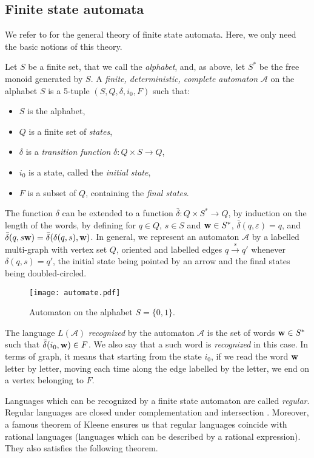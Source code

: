 \documentclass[reqno,12pt]{amsart}
\theoremstyle{definition}
\begin{document}
\subsection{Finite state automata}


We refer to \cite{HOP} for the general theory of finite state automata. Here, we only need the basic notions of this theory.

Let $S$ be a finite set, that we call the \emph{alphabet}, and, as above, let $S^*$ be the free monoid generated by $S$. A \emph{finite, deterministic, complete automaton} $\mathcal{A}$ on the alphabet $S$ is a 5-tuple $(S,Q, \delta, i_0, F)$ such that:
\begin{itemize}
\item $S$ is the alphabet, 
\item $Q$ is a finite set of \emph{states},
\item $\delta$ is a \emph{transition function} $\delta : Q \times S \rightarrow Q$,
\item $i_0$ is a state, called the \emph{initial state},
\item $F$ is a subset of $Q$, containing the \emph{final states}.
\end{itemize}
The function $\delta$ can be extended to a function $\bar{\delta} : Q \times S^* \rightarrow Q$, by induction on the length of the words, by defining for $q\in Q$, $s \in S$ and ${\bf w}\in S^*$, $\bar{\delta}(q, \varepsilon)=q$,  and  $\bar{\delta}(q, s{\bf w})=\bar{\delta}(\delta(q,s) , {\bf w})$. In general, we represent an automaton $\mathcal{A}$ by a labelled multi-graph with vertex set $Q$, oriented and labelled edges  $q \stackrel{s}{\rightarrow} q' $ whenever $\delta(q,s)= q'$, the initial state being pointed by an arrow and the final states being doubled-circled.

\begin{figure}[h!]
\texttt{[image: automate.pdf]}
\caption{Automaton on the alphabet $S=\{0,1\}$.}
\end{figure}

The language $L(\mathcal{A})$ \emph{recognized} by the automaton $\mathcal{A}$ is the set of words ${\bf w}\in S^*$ such that $\bar{\delta}(i_0, {\bf w}) \in F$.  We also say that a such word is \emph{recognized} in this case. In terms of graph, it means that starting from the state $i_0$,  if we read the word $\bf w$ letter by letter, moving each time along the edge labelled by the letter, we end on a vertex belonging to $F$.

Languages which can be recognized by a finite state automaton are called \emph{regular}.  Regular languages are closed under complementation and intersection \cite{HOP}. Moreover, a famous theorem of Kleene ensures us that regular languages coincide with rational languages (languages which can be described by a rational expression). They also satisfies the following theorem.
\end{document}

